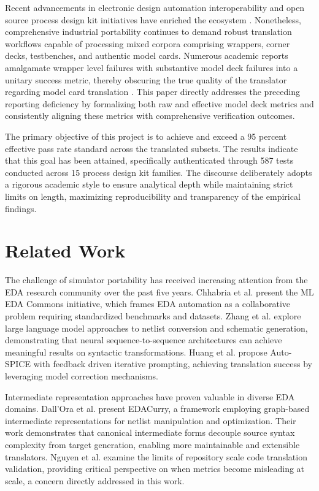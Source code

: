 \documentclass[10pt,twocolumn]{article}
\begin{document}
Recent advancements in electronic design automation interoperability and open source process design kit initiatives have enriched the ecosystem \cite{r15,r16,r17}. Nonetheless, comprehensive industrial portability continues to demand robust translation workflows capable of processing mixed corpora comprising wrappers, corner decks, testbenches, and authentic model cards. Numerous academic reports amalgamate wrapper level failures with substantive model deck failures into a unitary success metric, thereby obscuring the true quality of the translator regarding model card translation \cite{r18,r19}. This paper directly addresses the preceding reporting deficiency by formalizing both raw and effective model deck metrics and consistently aligning these metrics with comprehensive verification outcomes. 

The primary objective of this project is to achieve and exceed a 95 percent effective pass rate standard across the translated subsets. The results indicate that this goal has been attained, specifically authenticated through 587 tests conducted across 15 process design kit families. The discourse deliberately adopts a rigorous academic style to ensure analytical depth while maintaining strict limits on length, maximizing reproducibility and transparency of the empirical findings.

\section{Related Work}
The challenge of simulator portability has received increasing attention from the EDA research community over the past five years. Chhabria et al. \cite{r19} present the ML EDA Commons initiative, which frames EDA automation as a collaborative problem requiring standardized benchmarks and datasets. Zhang et al. \cite{r20} explore large language model approaches to netlist conversion and schematic generation, demonstrating that neural sequence-to-sequence architectures can achieve meaningful results on syntactic transformations. Huang et al. \cite{r21} propose Auto-SPICE with feedback driven iterative prompting, achieving translation success by leveraging model correction mechanisms.

Intermediate representation approaches have proven valuable in diverse EDA domains. Dall'Ora et al. \cite{r22} present EDACurry, a framework employing graph-based intermediate representations for netlist manipulation and optimization. Their work demonstrates that canonical intermediate forms decouple source syntax complexity from target generation, enabling more maintainable and extensible translators. Nguyen et al. \cite{r23} examine the limits of repository scale code translation validation, providing critical perspective on when metrics become misleading at scale, a concern directly addressed in this work.
\end{document}
